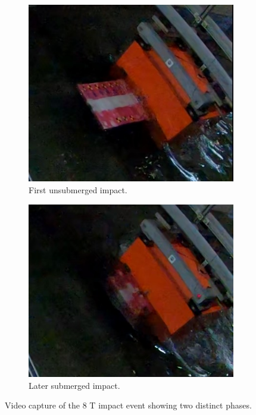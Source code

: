 \documentclass{article}
\begin{document}
{\begin{figure}[htbp]
    \centering
    \begin{subfigure}[b]{0.6\textwidth}
        \centering
        \includegraphics[width=\textwidth]{first_impact.jpg}
        \caption{First unsubmerged impact.}
        \label{fig:first_impact}
    \end{subfigure}
    \hfill
    
    \begin{subfigure}[b]{0.6\textwidth}
        \centering
        \includegraphics[width=\textwidth]{second_impact.jpg}
        \caption{Later submerged impact.}
        \label{fig:second_impact}
    \end{subfigure}
    \caption{Video capture of the 8 T impact event showing two distinct phases.}
    \label{fig:impact_combined}
    

\end{figure}}
\end{document}
